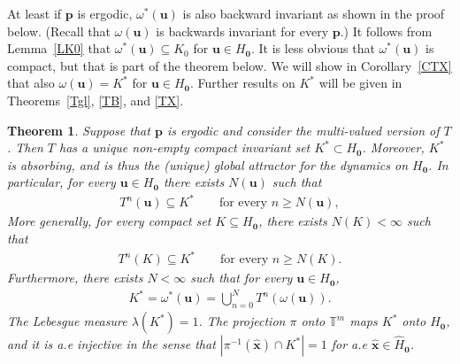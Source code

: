 \documentclass[11pt,reqno,tbtags,a4paper]{amsart}
\numberwithin{equation}{section}
\renewcommand\ge{\geq}
\renewcommand\geq{\geqslant}
\theoremstyle{plain}%
\newtheorem{theorem}{Theorem}[section]
\theoremstyle{definition}
\theoremstyle{remark}
\newcommand{\refTs}[1]{Theorems~\ref{#1}}
\newcommand{\refC}[1]{Corollary~\ref{#1}}
\newcommand{\refL}[1]{Lemma~\ref{#1}}
\newcommand\punkt{\xperiod}    %
\newcommand{\aex}{a.e\punkt}
\newcommand\bbT{\mathbb T}
\newcommand\gl{\lambda}
\newcommand\cL{{\omega}}
\newcommand\qw{^{-1}}
\newcommand\Ho{H_{\0}}
\newcommand\hHo{\hH_{\0}}
\newcommand\vp{\mathbf{p}}
\newcommand\vu{\mathbf{u}}
\newcommand\hvx{\hat{\mathbf{x}}}
\newcommand\hH{\widehat{H}}
\newcommand\cLx{\cL^*}
\newcommand\Kx{K^*}
\newcommand\0{{\boldsymbol 0}}
\newcommand\1{{\boldsymbol 1}}
\begin{document}
At least if $\vp$ is ergodic, $\cLx(\vu)$
is also backward invariant 
as shown in the proof below.
(Recall that $\cL(\vu)$ is backwards invariant for every $\vp$.)
It follows from \refL{LK0} that $\cLx(\vu)\subseteq K_0$ for $\vu\in\Ho$.
It is less obvious that $\cLx(\vu)$ is compact, but  that is part of the
theorem below.
We will show in \refC{CTX} that also $\cL(\vu)=\Kx$ for $\vu\in\Ho$.
Further results on $\Kx$ will be given in \refTs{Tgl}, \ref{TB}, and \ref{TX}.

\begin{theorem}\label{Tinv}
Suppose that $\vp$ is ergodic and
consider the multi-valued version of $T$. 
Then $T$ has a unique non-empty compact invariant set $\Kx\subset\Ho$.
Moreover, $\Kx$ is absorbing, and is thus the (unique)
global attractor for the dynamics on $\Ho$.
In particular, for every $\vu\in\Ho$ there exists $N(\vu)$ such that
\begin{align}
T^n(\vu)\subseteq \Kx \qquad\text{for every }n\ge N(\vu),  
\end{align}
More generally, 
for every compact set $K\subseteq\Ho$,
there exists $N(K)<\infty$ such that
\begin{align}\label{tinvK}
  T^n(K)\subseteq \Kx
\qquad\text{for every }n\ge N(K).
\end{align}
Furthermore, 
there exists $N<\infty$ such that
for every $\vu\in\Ho$, 
\begin{align}\label{tinv}
  \Kx=\cLx(\vu)=\bigcup_{n=0}^NT^n(\cL(\vu))
.\end{align}
The Lebesgue measure $\gl(\Kx)=1$.
The projection $\pi$ onto $\bbT^m$ maps $\Kx$ onto $\hHo$, and it is
\aex{} injective in the sense that $|\pi\qw(\hvx)\cap \Kx|=1$
for \aex{} $\hvx\in\hHo$.
\end{theorem}
\end{document}
